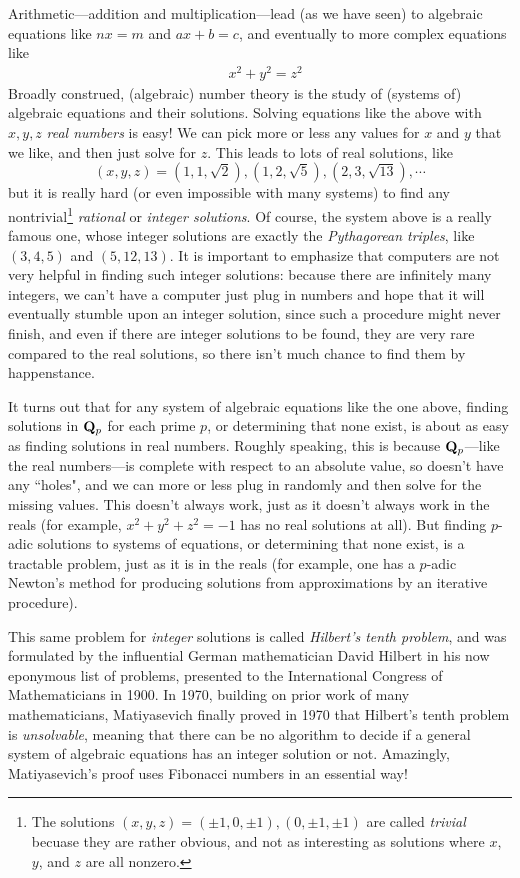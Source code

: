 \documentclass[11pt,oneside]{amsart}
\begin{document}
Arithmetic---addition and multiplication---lead (as we have seen) to 
algebraic equations like $nx=m$ and $ax+b=c$, and eventually to more complex  equations
like
\begin{align*}
	&x^2 + y^2 = z^2
\end{align*}
Broadly construed, (algebraic) number theory is the study of (systems of) algebraic equations and their solutions.  
Solving equations like the above with $x,y,z$ {\em real numbers} is easy!  We can pick more or less
any values for $x$ and $y$ that we like, and then just solve for $z$.  This leads to lots of real solutions, like
$$
(x,y,z) = (1,1,\sqrt{2}), (1,2,\sqrt{5}), (2,3,\sqrt{13}),\cdots
$$
but it is really hard (or even impossible with many systems) to find any nontrivial\footnote{
The solutions $(x,y,z)=(\pm 1, 0,\pm 1), (0,\pm1, \pm 1)$ are called {\em trivial}
becuase they are rather obvious, and not as interesting as solutions where $x$, $y$, and $z$ are all nonzero.
}
{\em rational} or {\em integer solutions}.
Of course, the system above is a really famous one, whose integer solutions are exactly the {\em Pythagorean triples},
like $(3,4,5)$ and $(5,12,13)$.  It is important to emphasize that computers are not very helpful in finding such integer solutions:
because there are infinitely many integers, we can't have a computer just plug in numbers and hope that it will eventually stumble upon an integer solution,
since such a procedure might never finish, and even if there are integer solutions to be found, they are very rare compared to the real solutions,
so there isn't much chance to find them by happenstance.  

It turns out that for any system of algebraic equations like the one above, 
finding solutions in $\mathbf{Q}_p$ for each prime $p$, or determining that none exist, 
is about as easy as finding solutions in real numbers.  Roughly speaking, this is because $\mathbf{Q}_p$---like the real numbers---is complete
with respect to an absolute value, so doesn't have any ``holes", and we can more or less plug in randomly and then solve for the missing values.
This doesn't always work, just as it doesn't always work in the reals (for example, $x^2+y^2+z^2 = -1$ has no real solutions at all).
But finding $p$-adic solutions to systems of equations, or determining that none exist, is a tractable problem,
just as it is in the reals (for example, one has a $p$-adic Newton's method for producing solutions from approximations by an iterative procedure).

This same problem for {\em integer} solutions is called {\em Hilbert's tenth problem}, and was formulated by the influential 
German mathematician David Hilbert in his now eponymous list of problems, presented to the International Congress of Mathematicians in 1900.
In 1970, building on prior work of many mathematicians, Matiyasevich finally proved in 1970 that Hilbert's tenth problem is {\em unsolvable},
meaning that there can be no algorithm to decide if a general system of algebraic equations has an integer solution or not.
Amazingly, Matiyasevich's proof uses Fibonacci numbers in an essential way!
\end{document}

